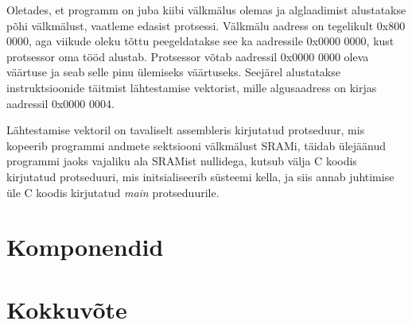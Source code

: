 \documentclass[12pt,a4paper]{article}
\begin{document}
Oletades, et programm on juba kiibi välkmälus olemas ja alglaadimist
alustatakse põhi välkmälust, vaatleme edasist protsessi. Välkmälu aadress on
tegelikult 0x800 0000, aga viikude oleku tõttu peegeldatakse see ka aadressile
0x0000 0000, kust protsessor oma tööd alustab.  Protsessor võtab aadressil
0x0000 0000 oleva väärtuse ja seab selle pinu ülemiseks väärtuseks. Seejärel
alustatakse instruktsioonide täitmist lähtestamise vektorist, mille
algusaadress on kirjas aadressil 0x0000 0004. \cite{f1rm}

Lähtestamise vektoril on tavaliselt assembleris kirjutatud protseduur, mis
kopeerib programmi andmete sektsiooni välkmälust SRAMi, täidab ülejäänud programmi jaoks
vajaliku ala SRAMist nullidega, kutsub välja C koodis kirjutatud
protseduuri, mis initsialiseerib süsteemi kella, ja siis annab juhtimise üle C
koodis kirjutatud \textit{main} protseduurile.

\section{Komponendid}
\section{Kokkuvõte}



\end{document}
